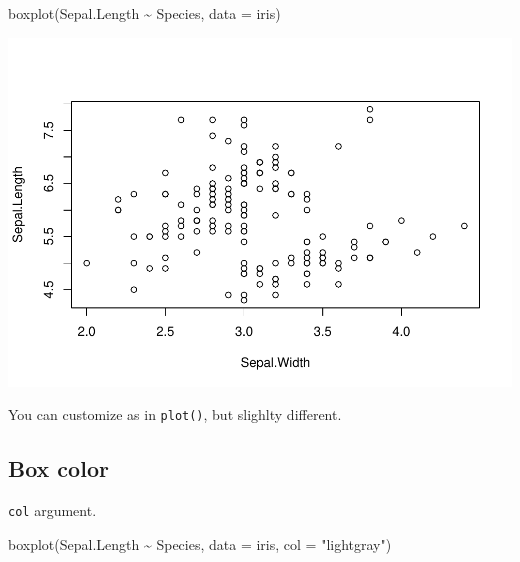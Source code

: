 \documentclass[
]{book}
\newenvironment{Shaded}{\begin{snugshade}}{\end{snugshade}}
\newcommand{\AttributeTok}[1]{\textcolor[rgb]{0.77,0.63,0.00}{#1}}
\newcommand{\FunctionTok}[1]{\textcolor[rgb]{0.00,0.00,0.00}{#1}}
\newcommand{\NormalTok}[1]{#1}
\newcommand{\SpecialCharTok}[1]{\textcolor[rgb]{0.00,0.00,0.00}{#1}}
\newcommand{\StringTok}[1]{\textcolor[rgb]{0.31,0.60,0.02}{#1}}
\begin{document}
\begin{Shaded}
\begin{Highlighting}[]
\FunctionTok{boxplot}\NormalTok{(Sepal.Length }\SpecialCharTok{\textasciitilde{}}\NormalTok{ Species, }\AttributeTok{data =}\NormalTok{ iris)}
\end{Highlighting}
\end{Shaded}

\begin{center}\includegraphics{biostats_files/figure-latex/unnamed-chunk-123-1} \end{center}

You can customize as in \texttt{plot()}, but slighlty different.

\hypertarget{box-color}{%
\subsection{Box color}\label{box-color}}

\texttt{col} argument.

\begin{Shaded}
\begin{Highlighting}[]
\FunctionTok{boxplot}\NormalTok{(Sepal.Length }\SpecialCharTok{\textasciitilde{}}\NormalTok{ Species, }\AttributeTok{data =}\NormalTok{ iris,}
        \AttributeTok{col =} \StringTok{"lightgray"}\NormalTok{)}
\end{Highlighting}
\end{Shaded}
\end{document}
